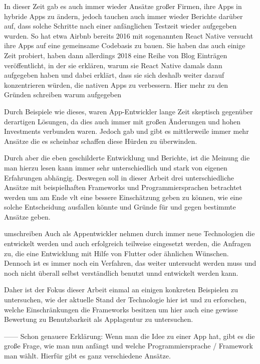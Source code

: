 In dieser Zeit gab es auch immer wieder Ansätze großer Firmen, ihre Apps in hybride Apps zu ändern, jedoch tauchen auch immer wieder Berichte darüber auf, dass solche Schritte nach einer anfänglichen Testzeit wieder aufgegeben wurden. So hat etwa Airbnb bereits 2016 mit sogenannten React Native versucht ihre Apps auf eine gemeinsame Codebasis zu bauen. Sie haben das auch einige Zeit probiert, haben dann allerdings 2018 eine Reihe von Blog Einträgen veröffentlicht, in der sie erklären, warum sie React Native damals dann aufgegeben haben und dabei erklärt, dass sie sich deshalb weiter darauf konzentrieren würden, die nativen Apps zu verbessern. 
\TODO Hier mehr zu den Gründen schreiben warum aufgegeben

Durch Beispiele wie dieses, waren App-Entwickler lange Zeit skeptisch gegenüber derartigen Lösungen, da dies auch immer mit großen Änderungen und hohen Investments verbunden waren.
Jedoch gab und gibt es mittlerweile immer mehr Ansätze die es scheinbar schaffen diese Hürden zu überwinden.

Durch aber die eben geschilderte Entwicklung und Berichte, ist die Meinung die man hierzu lesen kann immer sehr unterschiedlich und stark von eigenen Erfahrungen abhängig. 
Deswegen soll in dieser Arbeit drei unterschiedliche Ansätze mit beispielhaften Frameworks und Programmiersprachen betrachtet werden um am Ende vlt eine bessere Einschätzung geben zu können, wie eine solche Entscheidung ausfallen könnte und Gründe für und gegen bestimmte Ansätze geben.



\TODO umschreiben
Auch als Appentwickler nehmen durch immer neue Technologien die entwickelt werden und auch erfolgreich teilweise eingesetzt werden, die Anfragen zu, die eine Entwicklung mit Hilfe von Flutter oder ähnlichen Wünschen. Dennoch ist es immer noch ein Verfahren, das weiter untersucht werden muss und noch nicht überall selbst verständlich benutzt unnd entwickelt werden kann.

Daher ist der Fokus dieser Arbeit einmal an einigen konkreten Beispielen zu untersuchen, wie der aktuelle Stand der Technologie hier ist und zu erforschen, welche Einschränkungen die Frameworks besitzen um hier auch eine gewisse Bewertung zu Benutzbarkeit als Applagentur zu untersuchen.

------
Schon genauere Erklärung:
Wenn man die Idee zu einer App hat, gibt es die große Frage, wie man nun anfängt und welche Programmiersprache / Framework man wählt. Hierfür gibt es ganz verschiedene Ansätze.  

